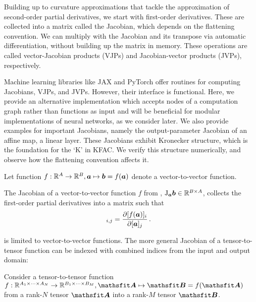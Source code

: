 Building up to curvature approximations that tackle the approximation of second-order partial derivatives, we start with first-order derivatives.
These are collected into a matrix called the Jacobian, which depends on the flattening convention.
We can multiply with the Jacobian and its transpose via automatic differentiation, without building up the matrix in memory.
These operations are called vector-Jacobian products (VJPs) and Jacobian-vector products (JVPs), respectively.

Machine learning libraries like JAX and PyTorch offer routines for computing Jacobians, VJPs, and JVPs.
However, their interface is functional.
Here, we provide an alternative implementation which accepts nodes of a computation graph rather than functions as input and will be beneficial for modular implementations of neural networks, as we consider later.
We also provide examples for important Jacobians, namely the output-parameter Jacobian of an affine map, \ie  a linear layer.
These Jacobians exhibit Kronecker structure, which is the foundation for the `K' in KFAC.
We verify this structure numerically, and observe how the flattening convention affects it.

\begin{setup}\label{setup:vector_to_vector_function}
  Let function $f: {\mathbb{R}}^A \to {\mathbb{R}}^B, {\bm{a}} \mapsto {\bm{b}} = f({\bm{a}})$ denote a vector-to-vector function.
\end{setup}

\begin{definition}\label{def:vector_jacobian}
  The Jacobian of a vector-to-vector function $f$ from , $\mathrm{J}_{{\bm{a}}}{\bm{b}} \in {\mathbb{R}}^{B \times A}$, collects the first-order partial derivatives into a matrix such that
  \begin{align*}
    [\jac_{\va} \vb]_{i,j} = \frac{\partial [f(\va)]_i}{\partial [\va]_j}\,.
  \end{align*}
\end{definition}
 is limited to vector-to-vector functions.
The more general Jacobian of a tensor-to-tensor function can be indexed with combined indices from the input and output domain:

\begin{setup}\label{setup:jacobians}
  Consider a tensor-to-tensor function $f: \sR^{A_1 \times \dots \times A_N} \to \sR^{B_1 \times \dots \times B_M}, \tA \mapsto \tB = f(\tA)$ from a rank-$N$ tensor $\tA$ into a rank-$M$ tensor $\tB$.
\end{setup}

